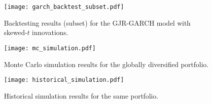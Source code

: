 \documentclass{article}
\begin{document}
\begin{figure}[H]
    \centering
    \begin{minipage}{0.95\textwidth}
        \centering
        \texttt{[image: garch\_backtest\_subset.pdf]}
        \caption{Backtesting results (subset) for the GJR-GARCH model with skewed-$t$ innovations.}
    \end{minipage}
\end{figure}

\begin{figure}[H]
    \centering
    \begin{minipage}{0.95\textwidth}
        \centering
        \texttt{[image: mc\_simulation.pdf]}
        \caption{Monte Carlo simulation results for the globally diversified portfolio.}
    \end{minipage}
\end{figure}

\begin{figure}[H]
    \centering
    \begin{minipage}{0.95\textwidth}
        \centering
        \texttt{[image: historical\_simulation.pdf]}
        \caption{Historical simulation results for the same portfolio.}
    \end{minipage}
\end{figure}
\end{document}
